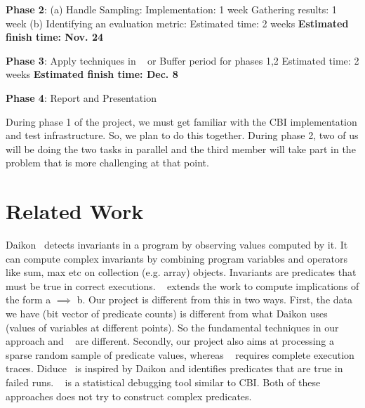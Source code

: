 {\bf Phase 2}: \newline
(a) Handle Sampling: \newline
\hspace*{5ex}Implementation: 1 week \newline
\hspace*{5ex}Gathering results: 1 week \newline
(b) Identifying an evaluation metric: \newline
\hspace*{5ex}Estimated time: 2 weeks \newline
{\bf Estimated finish time: Nov.  24}

{\bf Phase 3}: Apply techniques in ~\cite{Zheng:2006:SDSIMB} or Buffer period for phases 1,2 \newline
\hspace*{5ex}Estimated time: 2 weeks \newline
{\bf Estimated finish time: Dec. 8}

{\bf Phase 4}: Report and Presentation

During phase 1 of the project, we must get familiar with the CBI implementation and test infrastructure.  So, we plan to do this together.  During phase 2, two of us will be doing the two tasks in parallel and the third member will take part in the problem that is more challenging at that point.

\section{Related Work}
Daikon~\cite{ErnstPGMPTX2006} detects invariants in a program by observing values computed by it.  It can compute complex invariants by combining program variables and operators like sum, max etc on collection (e.g. array) objects.  Invariants are predicates that must be true in correct executions.  ~\cite{ErnstDRAFT} extends the work to compute implications of the form a $\implies$ b.  Our project is different from this in two ways.  First, the data we have (bit vector of predicate counts) is different from what Daikon uses (values of variables at different points).  So the fundamental techniques in our approach and ~\cite{ErnstDRAFT} are different.  Secondly, our project also aims at processing a sparse random sample of predicate values, whereas ~\cite{ErnstPGMPTX2006} requires complete execution traces.  Diduce~\cite{581377} is inspired by Daikon and identifies predicates that are true in failed runs.  ~\cite{1081753} is a statistical debugging tool similar to CBI.  Both of these approaches does not try to construct complex predicates.
